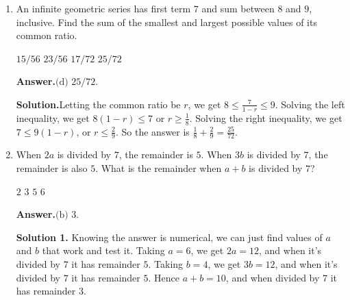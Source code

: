 \documentclass[11pt,paper=letter]{scrartcl}
\newcommand{\ans}{{\sffamily \bfseries Answer.}\;}
\newcommand{\ansb}[2]{\ans\(\boxed{\text{(#1) #2}}\).}
\newcommand{\sol}{{\sffamily \bfseries Solution.}\;}
\newcommand{\soln}[1]{{\sffamily \bfseries Solution #1.}\;}
\begin{document}
\begin{enumerate}[left=0pt]
\soln2 A fully general method is to use the product-to-sum formula to telescope the sum. We want to use the formula $2\cos x \sin y = \left(\sin(x + y) - \sin(x - y)\right)$, so we need to figure out what value of $\sin y$ would make the telescoping work. We want to cancel, say, $\sin\left(\frac{\pi}{3} + y\right)$ and $\sin\left(\frac{2\pi}{3} - y\right)$. This means we want $y = \frac{\pi}{6}$. Letting the sum be $S$, we multiply through by $2\sin \frac{\pi}{6}$ and use the product-to-sum formula to get
\begin{align*}
2S\left(\sin \frac{\pi}{6}\right)
&= 2\cos\frac{0\pi}{3}\sin\frac{\pi}{6}
+ 2\cos\frac{1\pi}{3}\sin\frac{\pi}{6}
+ 2\cos\frac{2\pi}{3}\sin\frac{\pi}{6}
+ \cdots
+ 2\cos\frac{2016\pi}{3}\sin\frac{\pi}{6} \\
&= \left(\sin \frac{\pi}{6} - \sin \frac{-\pi}{6}\right)
+ \left(\sin \frac{3\pi}{6} - \sin \frac{\pi}{6}\right)
+ \left(\sin \frac{5\pi}{6} - \sin \frac{3\pi}{6}\right)
+ \cdots \\
&+ \left(\sin \frac{4033\pi}{6} - \sin \frac{4031\pi}{6}\right) \\
&= -\sin \frac{-\pi}{6} + \sin \frac{4033\pi}{6}.
\end{align*}
This means $2S \sin \frac{\pi}{6} = -\sin \frac{-\pi}{6} + \sin \frac{4033\pi}{6} = \frac{1}{2} + \frac{1}{2} = 1$, and hence $S = 1$.

\item An infinite geometric series has first term $7$ and sum between $8$ and $9$, inclusive. Find the sum of the smallest and largest possible values of its common ratio.

\fourch
{$15/56$}
{$23/56$}
{$17/72$}
{$25/72$}

\ansb{d}{$25/72$}

\sol Letting the common ratio be $r$, we get $8 \le \frac{7}{1-r} \le 9$. Solving the left inequality, we get $8(1 - r) \le 7$ or $r \ge \frac{1}{8}$. Solving the right inequality, we get $7 \le 9(1 - r)$, or $r \le \frac{2}{9}$. So the answer is $\frac{1}{8} + \frac{2}{9} = \frac{25}{72}$.

\item When $2a$ is divided by $7$, the remainder is $5$. When $3b$ is divided by $7$, the remainder is also $5$. What is the remainder when $a + b$ is divided by $7$?

\fourch
{$2$}
{$3$}
{$5$}
{$6$}

\ansb{b}{$3$}

\soln1 Knowing the answer is numerical, we can just find values of $a$ and $b$ that work and test it. Taking $a = 6$, we get $2a = 12$, and when it's divided by $7$ it has remainder $5$. Taking $b = 4$, we get $3b = 12$, and when it's divided by $7$ it has remainder $5$. Hence $a + b = 10$, and when divided by $7$ it has remainder $3$.


\end{enumerate}
\end{document}
